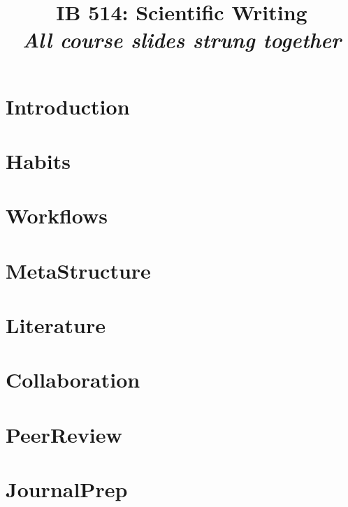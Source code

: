 \documentclass{beamer}
\title{\textbf{IB 514: Scientific Writing}\\{\footnotesize \textit{All course slides strung together}}}
\newcommand{\addsection}[1]{%
    \section{#1}
    
    \begin{frame}
        \tableofcontents
    \end{frame}
}
\begin{document}
    \begin{frame}
        \maketitle
    \end{frame}

    \begin{frame}
        \tableofcontents
    \end{frame}

    \addsection{Introduction}
    \addsection{Habits}
    \addsection{Workflows}
    \addsection{MetaStructure}
    \addsection{Literature}
    \addsection{Collaboration}
    \addsection{PeerReview}
    \addsection{JournalPrep}
\end{document}
